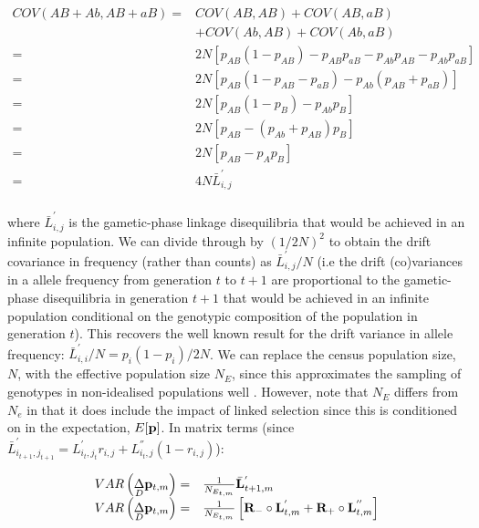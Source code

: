 \documentclass[12pt]{article}
\begin{document}
\begin{bibunit}
\begin{equation}
\begin{array}{rl}
COV(AB+Ab, AB+aB) =& COV(AB, AB)+COV(AB, aB)\\
&+COV(Ab, AB)+COV(Ab, aB)\\
=& 2N\left[p_{AB}(1-p_{AB})-p_{AB}p_{aB}-p_{Ab}p_{AB}-p_{Ab}p_{aB}\right]\\
=& 2N\left[p_{AB}(1-p_{AB}-p_{aB})-p_{Ab}(p_{AB}+p_{aB})\right]\\
=& 2N\left[p_{AB}(1-p_{B})-p_{Ab}p_{B}\right]\\
=& 2N\left[p_{AB}-(p_{Ab}+p_{AB})p_{B}\right]\\
=& 2N\left[p_{AB}-p_{A}p_{B}\right]\\
=& 4N\bar{L}^{'}_{i,j}\\
\end{array}
\end{equation}

where $\bar{L}^{'}_{i,j}$ is the gametic-phase linkage disequilibria that would be achieved in an infinite population. We can divide through by $(1/2N)^2$ to obtain the drift covariance in frequency (rather than counts) as $\bar{L}^{'}_{i,j}/N$ (i.e the drift (co)variances in a allele frequency from generation $t$ to $t+1$ are proportional to the gametic-phase disequilibria in generation $t+1$ that would be achieved in an infinite population conditional on the genotypic composition of the population in generation $t$). This recovers the well known result for the drift variance in allele frequency: $\bar{L}^{'}_{i,i}/N = p_i(1-p_i)/2N$. We can replace the census population size, $N$, with the effective population size $N_E$, since this approximates the sampling of genotypes in non-idealised populations well \citep{ethier1980diffusion}. However, note that $N_E$ differs from $N_e$ in that it does include the impact of linked selection since this is conditioned on in the expectation, $E[{\bf p}]$. In matrix terms (since $\bar{L}^{'}_{i_{t+1},j_{t+1}}=L^{'}_{i_t,j_t}r_{i,j}+L^{''}_{i_t,j}(1-r_{i,j})$):

\begin{equation}
\begin{array}{rl}
VAR\left(\underset{D}\Delta {\bf p}_{t,m}\right) =& \frac{1}{N_{E_{t,m}}} \bar{\bf L}^{'}_{t+1,m}\\
VAR\left(\underset{D}\Delta {\bf p}_{t,m}\right) =& \frac{1}{N_{E_{t,m}}}\left[{\bf R}_{-}\circ{\bf L}^{'}_{t,m}+{\bf R}_{+}\circ{\bf L}^{''}_{t, m}\right]\\


\end{array}
\end{equation}
\end{bibunit}
\end{document}
